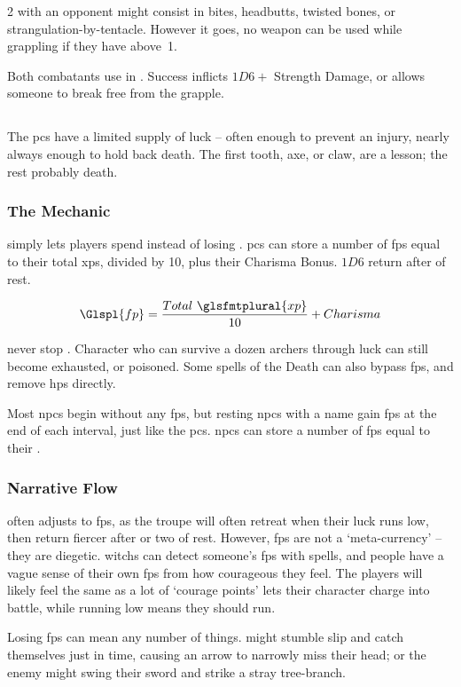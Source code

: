 \begin{multicols}{2}
\label{grappling}
with an opponent might consist in bites, headbutts, twisted bones, or
strangulation-by-tentacle.  However it goes, no \gls{weapon} can be used while
grappling if they have  above~1.

Both combatants use  in .
Success inflicts $1D6 + $ Strength Damage, or allows someone to break free from the grapple.

\stopcontents[Manoeuvres]

\subsection{}
\label{fate_points}

The \glspl{pc} have a limited supply of luck -- often enough to prevent an injury, nearly always enough to hold back death.
The first tooth, axe, or claw, are a lesson; the rest probably death.

\subsubsection{The Mechanic}
simply lets players spend  instead of losing .
\Glspl{pc} can store a number of \glspl{fp} equal to their total \glspl{xp}, divided by 10, plus their Charisma Bonus.
$1D6$ return after  of rest.

  $$\Glspl{fp} = \frac{Total~\glsfmtplural{xp}}{10} + Charisma$$

\noindent
{} never stop .
Character who can survive a dozen archers through luck can still become exhausted, or poisoned.
Some spells of the Death  can also bypass \glspl{fp}, and remove \glspl{hp} directly.

Most \glspl{npc} begin without any \glspl{fp}, but resting \glspl{npc} with a name gain \glspl{fp} at the end of each \gls{interval}, just like the \glspl{pc}.
\Glspl{npc} can store a number of \glspl{fp} equal to their .

\subsubsection{Narrative Flow}
often adjusts to \glspl{fp}, as the troupe will often \gls{retreat} when their luck runs low, then return fiercer after  or two of rest.
However, \glspl{fp} are not a `meta-currency' -- they are diegetic.
\Glspl{witch} can detect someone's \glspl{fp} with \glspl{spell}, and people have a vague sense of their own \glspl{fp} from how courageous they feel.
The players will likely feel the same as a lot of `courage points' lets their character charge into battle, while running low means they should run.

Losing \glspl{fp} can mean any number of things.
 might stumble slip and catch themselves just in time, causing an arrow to narrowly miss their head; or the enemy might swing their sword and strike a stray tree-branch.

\end{multicols}

